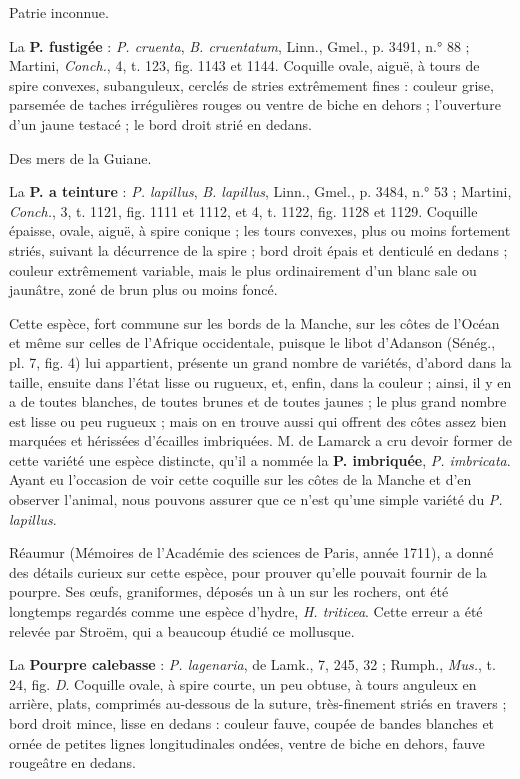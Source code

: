 \documentclass[a4paper, 11pt, oneside, polutonikogreek, french]{article}
\begin{document}
Patrie inconnue.

\bigskip

La \textbf{P. fustigée} : \emph{P. cruenta}, \emph{B. cruentatum}, Linn., Gmel., p. 3491, n.° 88 ; Martini, \emph{Conch.}, 4, t. 123, fig. 1143 et 1144. Coquille ovale, aiguë, à tours de spire convexes, subanguleux, cerclés de stries extrêmement fines : couleur grise, parsemée de taches irrégulières rouges ou ventre de biche en dehors ; l'ouverture d'un jaune testacé ; le bord droit strié en dedans.

Des mers de la Guiane.

\bigskip

La \textbf{P. a teinture} : \emph{P. lapillus}, \emph{B. lapillus}, Linn., Gmel., p. 3484, n.° 53 ; Martini, \emph{Conch.}, 3, t. 1121, fig. 1111 et 1112, et 4, t. 1122, fig. 1128 et 1129. Coquille épaisse, ovale, aiguë, à spire conique ; les tours convexes, plus ou moins fortement striés, suivant la décurrence de la spire ; bord droit épais et denticulé en dedans ; couleur extrêmement variable, mais le plus ordinairement d'un blanc sale ou jaunâtre, zoné de brun plus ou moins foncé.

Cette espèce, fort commune sur les bords de la Manche, sur les côtes de l'Océan et même sur celles de l'Afrique occidentale, puisque le libot d'Adanson (Sénég., pl. 7, fig. 4) lui appartient, présente un grand nombre de variétés, d'abord dans la taille, ensuite dans l'état lisse ou rugueux, et, enfin, dans la couleur ; ainsi, il y en a de toutes blanches, de toutes brunes et de toutes jaunes ; le plus grand nombre est lisse ou peu rugueux ; mais on en trouve aussi qui offrent des côtes assez bien marquées et hérissées d'écailles imbriquées. M. de Lamarck a cru devoir former de cette variété une espèce distincte, qu'il a nommée la \textbf{P. imbriquée}, \emph{P. imbricata}. Ayant eu l'occasion de voir cette coquille sur les côtes de la Manche et d'en observer l'animal, nous pouvons assurer que ce n'est qu'une simple variété du \emph{P. lapillus}.

Réaumur (Mémoires de l'Académie des sciences de Paris, année 1711), a donné des détails curieux sur cette espèce, pour prouver qu'elle pouvait fournir de la pourpre. Ses œufs, graniformes, déposés un à un sur les rochers, ont été longtemps regardés comme une espèce d'hydre, \emph{H. triticea}. Cette erreur a été relevée par Stroëm, qui a beaucoup étudié ce mollusque.

\bigskip

La \textbf{Pourpre calebasse} : \emph{P. lagenaria}, de Lamk., 7, 245, 32 ; Rumph., \emph{Mus.}, t. 24, fig. \emph{D}. Coquille ovale, à spire courte, un peu obtuse, à tours anguleux en arrière, plats, comprimés au-dessous de la suture, très-finement striés en travers ; bord droit mince, lisse en dedans : couleur fauve, coupée de bandes blanches et ornée de petites lignes longitudinales ondées, ventre de biche en dehors, fauve rougeâtre en dedans.
\end{document}
